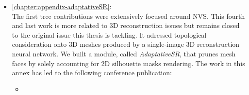\begin{itemize}
      \item \autoref{chapter:appendix-adaptativeSR}:  \\
      The first tree contributions were extensively focused around \ac{NVS}. This fourth and last work is more related to 3D reconstruction issues but remains closed to the original issue this thesis is tackling. It adressed topological consideration onto 3D meshes produced by a single-image 3D reconstruction neural network. We built a module, called \textit{AdaptativeSR}, that prunes mesh faces by solely accounting for 2D silhouette masks rendering. The work in this annex has led to the following conference publication:
      \begin{itemize}
            \item {}
      \end{itemize}
\end{itemize}


